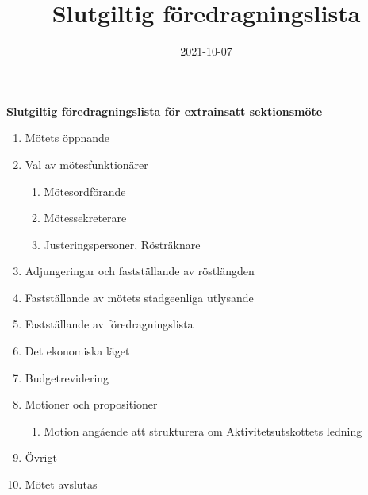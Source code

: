 \documentclass{datateknologsektionen-document}
\title{Slutgiltig föredragningslista}
\date{2021-10-07}
\begin{document}
\large
\begin{center}
  {\LARGE\bfseries Slutgiltig föredragningslista för extrainsatt sektionsmöte}
  \vspace{2mm}
\end{center}

\Large
\begin{enumerate}[topsep=0pt,itemsep=1ex]
  \item Mötets öppnande
  \item Val av mötesfunktionärer
        \begin{enumerate}[label*=\arabic*.,leftmargin=3em]
          \item Mötesordförande
          \item Mötessekreterare
          \item Justeringspersoner, Rösträknare
        \end{enumerate}
  \item Adjungeringar och fastställande av röstlängden
  \item Fastställande av mötets stadgeenliga utlysande
  \item Fastställande av föredragningslista
  \item Det ekonomiska läget
  \item Budgetrevidering
  \item Motioner och propositioner
        \begin{enumerate}[label*=\arabic*.,leftmargin=3em]
          \item Motion angående att strukturera om Aktivitetsutskottets ledning
        \end{enumerate}
  \item Övrigt
  \item Mötet avslutas
\end{enumerate}
\end{document}
